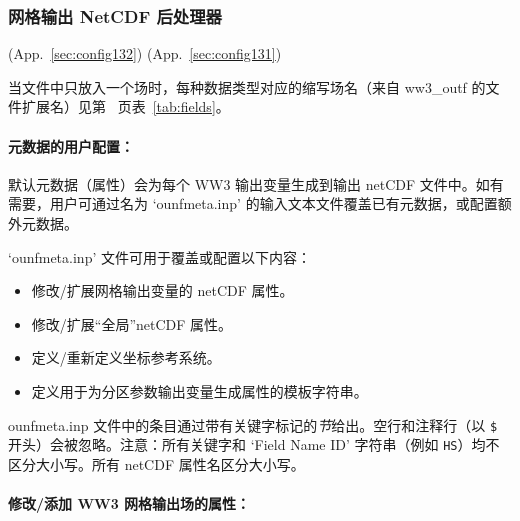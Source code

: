 \vsssub
\subsubsection{网格输出 NetCDF 后处理器} \label{sec:ww3ounf}
\vsssub

 (App.~\ref{sec:config132})
 (App.~\ref{sec:config131})


\vspace{\baselineskip}

\noindent
当文件中只放入一个场时，每种数据类型对应的缩写场名（来自 ww3\_outf 的文件扩展名）见第~\pageref{tab:fields} 页表~\ref{tab:fields}。

\noindent
\paragraph{元数据的用户配置：}

\noindent
默认元数据（属性）会为每个 WW3 输出变量生成到输出 netCDF 文件中。如有需要，用户可通过名为 `ounfmeta.inp' 的输入文本文件覆盖已有元数据，或配置额外元数据。


\noindent
`ounfmeta.inp' 文件可用于覆盖或配置以下内容：
\begin{itemize}
  \item 修改/扩展网格输出变量的 netCDF 属性。
  \item 修改/扩展“全局”netCDF 属性。
  \item 定义/重新定义坐标参考系统。
  \item 定义用于为分区参数输出变量生成属性的模板字符串。
\end{itemize}

\noindent
ounfmeta.inp 文件中的条目通过带有关键字标记的\emph{节}给出。空行和注释行（以 \texttt{\$} 开头）会被忽略。注意：所有关键字和 `Field Name ID' 字符串（例如 \texttt{HS}）均不区分大小写。所有 netCDF 属性名区分大小写。

\noindent
\paragraph{修改/添加 WW3 网格输出场的属性：}

